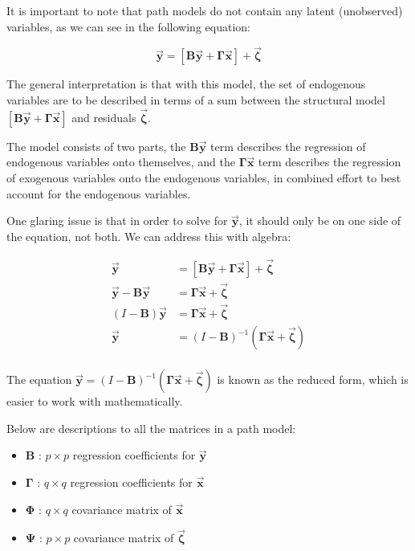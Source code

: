 \documentclass{article}
\begin{document}
\begin{multicols*}{2}
It is important to note that path models do not contain any latent (unobserved) variables, as we can see in the following equation: 

\[\mathbf{\vec{y}} = [\mathbf{B} \mathbf{\vec{y}} + \mathbf{\Gamma} \mathbf{\vec{x}}] + \mathbf{\vec{\zeta}}\]

The general interpretation is that with this model, the set of endogenous variables are to be described in terms of a sum between the structural model $[\mathbf{B} \mathbf{\vec{y}} + \mathbf{\Gamma} \mathbf{\vec{x}}]$ and residuals $\mathbf{\vec{\zeta}}$.

The model consists of two parts, the $\mathbf{B} \mathbf{\vec{y}}$ term describes the regression of endogenous variables onto themselves, and the $\mathbf{\Gamma} \mathbf{\vec{x}}$ term describes the regression of exogenous variables onto the endogenous variables, in combined effort to best account for the endogenous variables.

One glaring issue is that in order to solve for $\mathbf{\vec{y}}$, it should only be on one side of the equation, not both. We can address this with algebra:

\[
\begin{aligned}
    \mathbf{\vec{y}} &= [\mathbf{B} \mathbf{\vec{y}} + \mathbf{\Gamma} \mathbf{\vec{x}}] + \mathbf{\vec{\zeta}} \\
    \mathbf{\vec{y}} - \mathbf{B} \mathbf{\vec{y}} &= \mathbf{\Gamma} \mathbf{\vec{x}} + \mathbf{\vec{\zeta}} \\
    (I - \mathbf{B}) \mathbf{\vec{y}} &= \mathbf{\Gamma} \mathbf{\vec{x}} + \mathbf{\vec{\zeta}} \\
    \mathbf{\vec{y}} &= (I - \mathbf{B})^{-1}(\mathbf{\Gamma} \mathbf{\vec{x}} + \mathbf{\vec{\zeta}}) \\
\end{aligned}    
\]

The equation $\mathbf{\vec{y}} = (I - \mathbf{B})^{-1}(\mathbf{\Gamma} \mathbf{\vec{x}} + \mathbf{\vec{\zeta}})$ is known as the reduced form, which is easier to work with mathematically.

Below are descriptions to all the matrices in a path model:
\begin{itemize}
    \item $\mathbf{B}$ : $p \times p$ regression coefficients for $\mathbf{\vec{y}}$
    \item $\mathbf{\Gamma}$ : $q \times q$ regression coefficients for $\mathbf{\vec{x}}$
    \item $\mathbf{\Phi}$ : $q \times q$ covariance matrix of $\mathbf{\vec{x}}$
    \item $\mathbf{\Psi}$ : $p \times p$ covariance matrix of $\mathbf{\vec{\zeta}}$
\end{itemize}


\end{multicols*}
\end{document}
